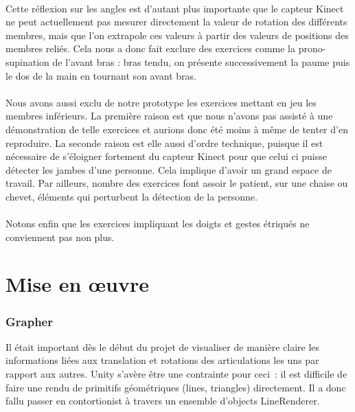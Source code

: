 \documentclass[french,12pt]{report}
\begin{document}
\paragraph{}
Cette réflexion sur les angles est d'autant plus importante que le capteur Kinect ne peut actuellement pas mesurer directement
la valeur de rotation des différents membres, mais que l'on extrapole ces valeurs à partir des valeurs de positions des membres
reliés. Cela nous a donc fait exclure des exercices comme la prono-supination de l'avant bras : bras tendu, on présente successivement la paume puis le dos de la main en tournant son avant bras.

\paragraph{}
Nous avons aussi exclu de notre prototype les exercices mettant en jeu les membres inférieurs. La première raison est que nous n'avons pas assisté à une démonstration de telle exercices et aurions donc été moins à même de tenter d'en reproduire. La 
seconde raison est elle aussi d'ordre technique, puisque il est nécessaire de s'éloigner fortement du capteur Kinect pour que 
celui ci puisse détecter les jambes d'une personne. Cela implique d'avoir un grand espace de travail. Par ailleurs, nombre 
des exercices font assoir le patient, sur une chaise ou chevet, éléments qui perturbent la détection de la personne.

\paragraph{}
Notons enfin que les exercices impliquant les doigts et gestes étriqués ne conviennent pas non plus.

		\section{Mise en œuvre}

		\subsubsection{Grapher}
Il était important dès le début du projet de visualiser de manière claire les 
informations liées aux translation et rotations des articulations les uns par 
rapport aux autres. Unity s'avère être une contrainte pour ceci~: il est difficile
de faire une rendu de primitifs géométriques (lines, triangles) directement. Il
a donc fallu passer en contortionist à travers un ensemble d'objects LineRenderer.
\end{document}
